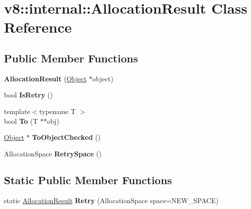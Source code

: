 \hypertarget{classv8_1_1internal_1_1_allocation_result}{}\section{v8\+:\+:internal\+:\+:Allocation\+Result Class Reference}
\label{classv8_1_1internal_1_1_allocation_result}
\subsection*{Public Member Functions}
\begin{DoxyCompactItemize}
\item 
{\bfseries Allocation\+Result} (\hyperlink{classv8_1_1internal_1_1_object}{Object} $\ast$object)\hypertarget{classv8_1_1internal_1_1_allocation_result_a070cd4a633aea946bc22da35de4e20d3}{}\label{classv8_1_1internal_1_1_allocation_result_a070cd4a633aea946bc22da35de4e20d3}

\item 
bool {\bfseries Is\+Retry} ()\hypertarget{classv8_1_1internal_1_1_allocation_result_a42620ae6917b2e46beb01e6d5ab1af9d}{}\label{classv8_1_1internal_1_1_allocation_result_a42620ae6917b2e46beb01e6d5ab1af9d}

\item 
{\footnotesize template$<$typename T $>$ }\\bool {\bfseries To} (T $\ast$$\ast$obj)\hypertarget{classv8_1_1internal_1_1_allocation_result_a200458fd748f27686583ca3e36fa7792}{}\label{classv8_1_1internal_1_1_allocation_result_a200458fd748f27686583ca3e36fa7792}

\item 
\hyperlink{classv8_1_1internal_1_1_object}{Object} $\ast$ {\bfseries To\+Object\+Checked} ()\hypertarget{classv8_1_1internal_1_1_allocation_result_a77e1f4d2f30a754f6a75b68867b7c259}{}\label{classv8_1_1internal_1_1_allocation_result_a77e1f4d2f30a754f6a75b68867b7c259}

\item 
Allocation\+Space {\bfseries Retry\+Space} ()\hypertarget{classv8_1_1internal_1_1_allocation_result_a112be2639d4a26bacacdd582fdd67feb}{}\label{classv8_1_1internal_1_1_allocation_result_a112be2639d4a26bacacdd582fdd67feb}

\end{DoxyCompactItemize}
\subsection*{Static Public Member Functions}
\begin{DoxyCompactItemize}
\item 
static \hyperlink{classv8_1_1internal_1_1_allocation_result}{Allocation\+Result} {\bfseries Retry} (Allocation\+Space space=N\+E\+W\+\_\+\+S\+P\+A\+CE)\hypertarget{classv8_1_1internal_1_1_allocation_result_a89de42812f610b130c34d3ecbe3321a5}{}\label{classv8_1_1internal_1_1_allocation_result_a89de42812f610b130c34d3ecbe3321a5}

\end{DoxyCompactItemize}

